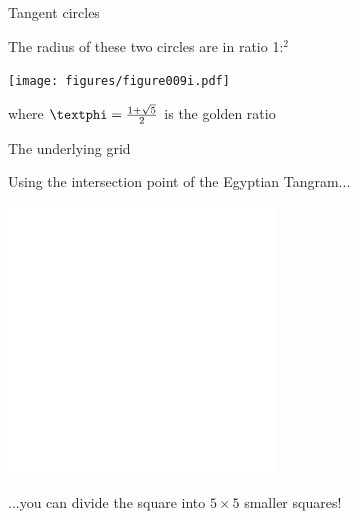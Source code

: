 \documentclass[14pt]{beamer}
\begin{document}

    \begin{frame}{Tangent circles}
        \begin{center}
            The radius of these two circles are in ratio 1:\textphi$^2$
        \end{center}\medskip
        \hspace{6.18em} \texttt{[image: figures/figure009i.pdf]} \\
        \begin{center}
             where $\text{\textphi} =\tfrac{1+\sqrt{5}}{2}$ is the golden ratio
        \end{center}
    \end{frame}


    \begin{frame}{The underlying grid}
        \begin{center}
            Using the intersection point of the Egyptian Tangram...
        \end{center}
        \hspace{6.18em} \includegraphics[scale=1.0]{figures/figure001f.pdf} \\
        \begin{center}
             ...you can divide the square into $5\!\times\!5$ smaller squares!
        \end{center}
    \end{frame}

\end{document}
